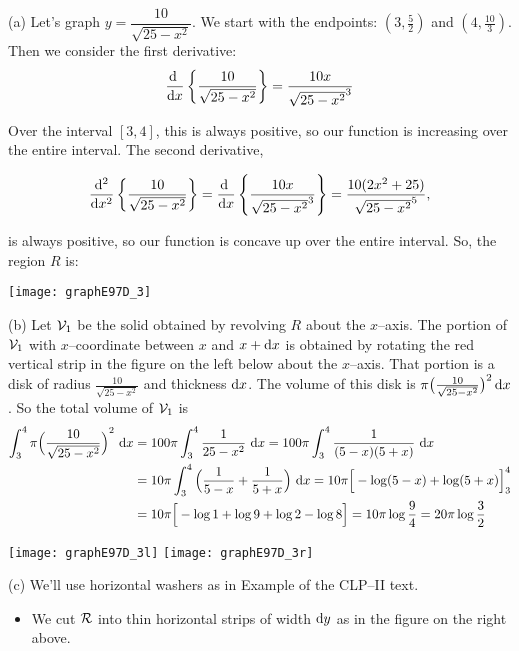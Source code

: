 \begin{solution} (a)
Let's graph $y=\dfrac{10}{\sqrt{25-x^2}}$.
We start with the endpoints: $(3,\frac{5}{2})$ and $(4,\frac{10}{3})$. Then we consider the first derivative:
\[\diff{}{x}\left\{\frac{10}{\sqrt{25-x^2}}\right\} = \frac{10x}{\sqrt{25-x^2}^3}\]

Over the interval $[3,4]$, this is always positive, so our function is increasing over the entire interval. The second derivative,

\[\ddiff{2}{}{x}\left\{\frac{10}{\sqrt{25-x^2}}\right\}=\diff{}{x}\left\{\frac{10x}{\sqrt{25-x^2}^3}\right\} = \frac{10(2x^2+25)}{\sqrt{25-x^2}^5},\]

is always positive, so our function is concave up over the entire interval. So,
the region $R$ is:

\begin{center}
       \texttt{[image: graphE97D\_3]}
\end{center}




\noindent (b)
Let $\mathcal{V}_1$ be the solid obtained by revolving
$R$ about the $x$--axis. The portion of $\mathcal{V}_1$ with $x$--coordinate
between $x$ and $x+\mathrm{d}x$ is obtained by rotating the red vertical strip in
the figure on the left below about the $x$--axis.
That portion is a disk of radius $\frac{10}{\sqrt{25-x^2}}$ and thickness
$\mathrm{d}x$. The volume of this disk is $\pi\big(\frac{10}{\sqrt{25-x^2}}\big)^2\,\mathrm{d}x$.
So the total volume of $\mathcal{V}_1$ is
\begin{align*}
\int_3^4\pi{\Big(\frac{10}{\sqrt{25-x^2}}\Big)}^2\ \mathrm{d}x
&=100\pi\int_3^4\frac{1}{25-x^2}\ \mathrm{d}x
=100\pi\int_3^4\frac{1}{(5-x)(5+x)}\ \mathrm{d}x \\
&=10\pi\int_3^4\Big(\frac{1}{5-x}+\frac{1}{5+x}\Big)\ \mathrm{d}x
=10\pi\Big[-\log(5-x)+\log(5+x)\Big]_3^4 \\
&=10\pi\Big[-\log1+\log9+\log2-\log8\Big]
=10\pi\log\frac{9}{4}=20\pi\log\frac{3}{2}
\end{align*}

\begin{center}
       \texttt{[image: graphE97D\_3l]}\qquad\qquad
       \texttt{[image: graphE97D\_3r]}
\end{center}



\noindent (c)
We'll use horizontal washers as in Example  
of the %
CLP--II text.
 \begin{itemize}
\item We cut $\mathcal{R}$ into thin horizontal  strips of width $\mathrm{d}y$ as in
the figure on the right above.


\end{itemize}
\end{solution}
